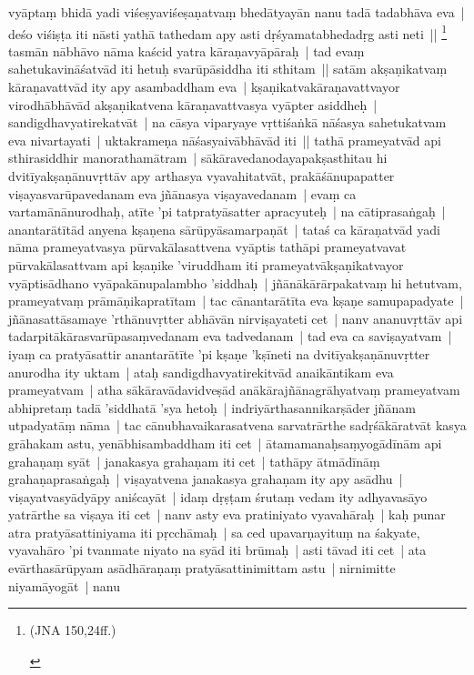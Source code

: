 \documentclass[article,12pt,a4paper]{memoir}
\begin{document}
	  \pstart vyāptaṃ bhidā yadi viśeṣyaviśeṣaṇatvaṃ bhedātyayān nanu tadā tadabhāva eva | deśo viśiṣṭa iti nāsti yathā tathedam apy asti dṛśyamatabhedadṛg asti neti || \footnote{\begin{english}(JNA 150,24ff.)\end{english}} \label{thakur75-124.8} tasmān nābhāvo nāma kaścid yatra kāraṇavyāpāraḥ | tad evaṃ sahetukavināśatvād iti hetuḥ svarūpāsiddha iti sthitam || \label{thakur75-124.10} satām akṣaṇikatvaṃ kāraṇavattvād ity apy asambaddham eva | kṣaṇikatvakāraṇavattvayor virodhābhāvād akṣaṇikatvena kāraṇavattvasya vyāpter asiddheḥ | sandigdhavyatirekatvāt | na cāsya viparyaye vṛttiśaṅkā nāśasya sahetukatvam eva nivartayati | uktakrameṇa nāśasyaivābhāvād iti || \label{thakur75-124.14} tathā prameyatvād api sthirasiddhir manorathamātram | sākāravedanodayapakṣasthitau hi dvitīyakṣaṇānuvṛttāv apy arthasya vyavahitatvāt, prakāśānupapatter viṣayasvarūpavedanam eva jñānasya viṣayavedanam | evaṃ ca vartamānānurodhaḥ, atīte 'pi tatpratyāsatter apracyuteḥ | na cātiprasaṅgaḥ | anantarātītād anyena kṣaṇena sārūpyāsamarpaṇāt | tataś ca kāraṇatvād yadi nāma prameyatvasya pūrvakālasattvena vyāptis tathāpi prameyatvavat pūrvakālasattvam api kṣaṇike 'viruddham iti prameyatvākṣaṇikatvayor vyāptisādhano vyāpakānupalambho 'siddhaḥ | jñānākārārpakatvaṃ hi hetutvam, prameyatvaṃ prāmāṇikapratītam | tac cānantarātīta eva kṣaṇe samupapadyate | \label{thakur75-124.22} jñānasattāsamaye 'rthānuvṛtter abhāvān nirviṣayateti cet | \label{thakur75-124.22a} nanv ananuvṛttāv api tadarpitākārasvarūpasaṃvedanam eva tadvedanam | tad eva ca saviṣayatvam | iyaṃ ca pratyāsattir anantarātīte 'pi kṣaṇe 'kṣīneti na dvitīyakṣaṇānuvṛtter anurodha ity uktam | ataḥ sandigdhavyatirekitvād anaikāntikam eva prameyatvam | \label{thakur75-124.26} atha sākāravādavidveṣād anākārajñānagrāhyatvaṃ prameyatvam abhipretaṃ tadā 'siddhatā 'sya hetoḥ | \label{thakur75-124.27} indriyārthasannikarṣāder jñānam utpadyatāṃ nāma | \label{thakur75-124.27a} tac cānubhavaikarasatvena sarvatrārthe sadṛśākāratvāt kasya grāhakam astu, \label{thakur75-124.28} yenābhisambaddham iti cet | \label{thakur75-124.28a} ātamamanaḥsaṃyogādīnām api grahaṇaṃ syāt | \label{thakur75-124.29} janakasya grahaṇam iti cet | \label{thakur75-124.29a} tathāpy ātmādīnāṃ grahaṇaprasaṅgaḥ | viṣayatvena janakasya grahaṇam ity apy asādhu | viṣayatvasyādyāpy aniścayāt | \label{thakur75-124.30} idaṃ dṛṣṭam śrutaṃ vedam ity adhyavasāyo yatrārthe sa viṣaya iti cet | \label{thakur75-124.31} nanv asty eva pratiniyato vyavahāraḥ | kaḥ punar atra pratyāsattiniyama iti pṛcchāmaḥ | sa ced upavarṇayituṃ na śakyate, vyavahāro 'pi tvanmate niyato na syād iti brūmaḥ | \label{thakur75-124.33} asti tāvad iti cet | \label{thakur75-124.34} ata evārthasārūpyam asādhāraṇaṃ pratyāsattinimittam astu | nirnimitte niyamāyogāt | \label{thakur75-125.1} nanu 
\end{document}
